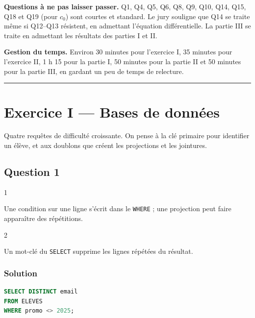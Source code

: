 \documentclass[11pt,a4paper]{article}
\begin{document}
\textbf{Questions à ne pas laisser passer.} Q1, Q4, Q5, Q6, Q8, Q9, Q10, Q14, Q15, Q18 et Q19 (pour \(c_0\)) sont courtes et standard. Le jury souligne que Q14 se traite même si Q12--Q13 résistent, en admettant l'équation différentielle. La partie III se traite en admettant les résultats des parties I et II.

\textbf{Gestion du temps.} Environ 30 minutes pour l'exercice I, 35 minutes pour l'exercice II, 1 h 15 pour la partie I, 50 minutes pour la partie II et 50 minutes pour la partie III, en gardant un peu de temps de relecture.

\begin{center}\rule{0.5\linewidth}{0.5pt}\end{center}

\hypertarget{exercice-i-bases-de-donnuxe9es}{%
\section{Exercice I --- Bases de données}\label{exercice-i-bases-de-donnuxe9es}}

Quatre requêtes de difficulté croissante. On pense à la clé primaire pour identifier un élève, et aux doublons que créent les projections et les jointures.

\hypertarget{question-1}{%
\subsection{Question 1}\label{question-1}}

\begin{indication}{1}

Une condition sur une ligne s'écrit dans le \texttt{WHERE} ; une projection peut faire apparaître des répétitions.

\end{indication}

\begin{indication}{2}

Un mot-clé du \texttt{SELECT} supprime les lignes répétées du résultat.

\end{indication}

\hypertarget{solution}{%
\subsubsection{Solution}\label{solution}}

\begin{lstlisting}[language=SQL]
SELECT DISTINCT email
FROM ELEVES
WHERE promo <> 2025;
\end{lstlisting}
\end{document}
